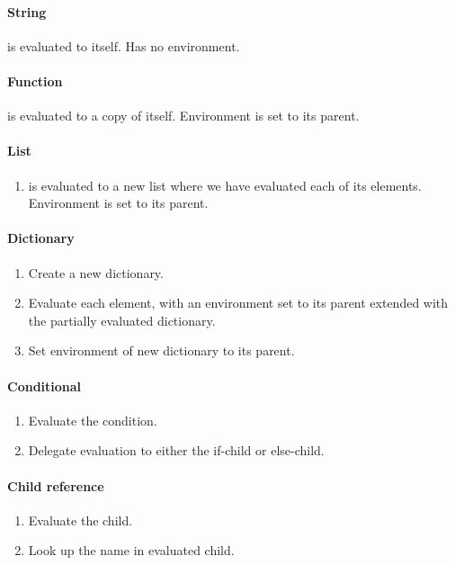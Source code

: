 \documentclass[a4paper,12pt]{article}
\begin{document}
\paragraph{String} is evaluated to itself. Has no environment.
\paragraph{Function} is evaluated to a copy of itself. Environment is set to its parent.
\paragraph{List}
\begin{enumerate}
\item is evaluated to a new list where we have evaluated each of its elements. Environment is set to its parent.
\end{enumerate}

\paragraph{Dictionary}
\begin{enumerate}
\item Create a new dictionary.
\item Evaluate each element, with an environment set to its parent extended with the partially evaluated dictionary.
\item Set environment of new dictionary to its parent.
\end{enumerate}

\paragraph{Conditional}
\begin{enumerate}
\item Evaluate the condition.
\item Delegate evaluation to either the if-child or else-child.
\end{enumerate}

\paragraph{Child reference}
\begin{enumerate}
\item Evaluate the child.
\item Look up the name in evaluated child.
\end{enumerate}
\end{document}
